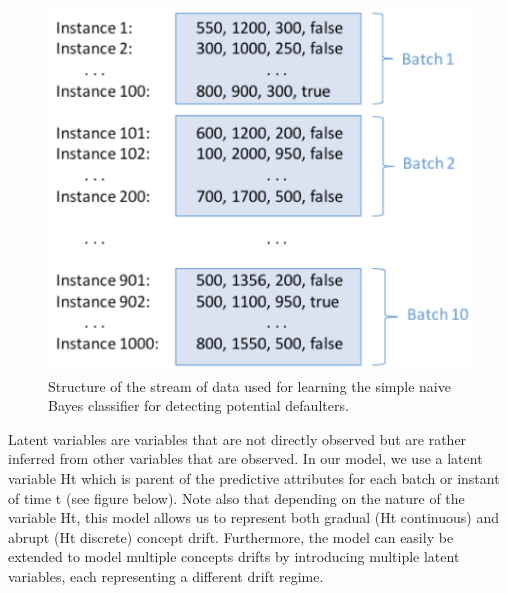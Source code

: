 \documentclass[10pt,a4paper]{article}
\begin{document}
\begin{figure}[h!]
	\centering
	\includegraphics[width=13cm]{img/cd_stream.png}
	\caption{Structure of the stream of data used for learning the simple naive Bayes classifier for detecting potential defaulters.}
	\label{fig:blog_conceptdrift:what:cd_stream}	
\end{figure}


Latent variables are variables that are not directly observed but are rather inferred from other variables that are observed. In our model, we use a latent variable Ht which is parent of the predictive attributes for each batch or instant of time t (see figure below).  Note also that depending on the nature of the variable Ht, this model allows us to represent both gradual (Ht continuous) and abrupt (Ht discrete) concept drift. Furthermore, the model can easily be extended to model multiple concepts drifts by introducing multiple latent variables, each representing a different drift regime.\newline 
\end{document}
